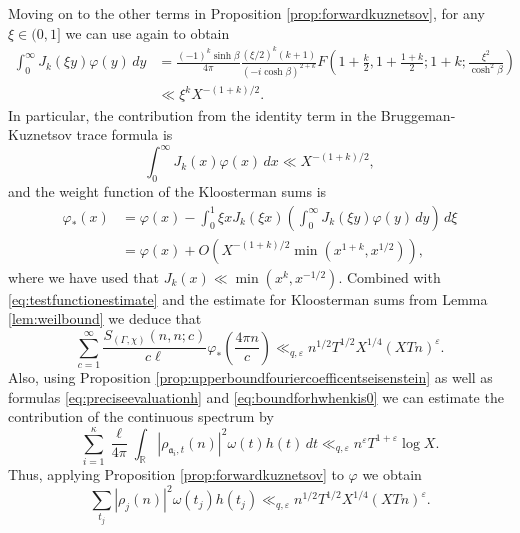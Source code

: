 \documentclass{article}
\theoremstyle{named}
\newcommand{\R}{\mathbb{R}}
\renewcommand{\a}{\mathfrak{a}}
\begin{document}
Moving on to the other terms in Proposition \ref{prop:forwardkuznetsov}, for any $\xi \in (0, 1]$ we can use \cite[\href{https://dlmf.nist.gov/10.22.E49}{(10.22.49)}]{dlmf} again to obtain
\begin{equation*}
\begin{aligned}
    \int_0^\infty J_k(\xi y)\varphi(y)\, dy  &=  \frac{(-1)^k \sinh \beta}{4\pi }\frac{(\xi/2)^k(k + 1)}{(-i\cosh \beta)^{2 + k}}F\left(1 + \frac{k}{2}, 1 +\frac{1 + k}{2}; 1 + k; \frac{\xi^2}{\cosh^2 \beta}\right)\\
    & \ll \xi^k X^{-(1 + k)/2}.
\end{aligned}
\end{equation*}
In particular, the contribution from the identity term in the Bruggeman-Kuznetsov trace formula is 
\begin{equation}\label{eq:identitytermestimate}
    \int_0^\infty J_k(x)\varphi(x) \, dx \ll X^{-(1 + k)/2},
\end{equation}
and the weight function of the Kloosterman sums is 
\begin{equation}\label{eq:weightkloostermansums}
\begin{aligned}
    \varphi_*(x) & = \varphi(x) - \int_0^1\xi x J_k(\xi x)\left(\int_0^\infty J_k(\xi y) \varphi(y)\, dy \right)\, d\xi\\
    & = \varphi(x) + O\left(X^{-(1 + k)/2} \min(x^{1 + k}, x^{1/2})\right),
\end{aligned}
\end{equation}
where we have used that $J_k(x) \ll \min(x^k, x^{-1/2})$. Combined with \eqref{eq:testfunctionestimate} and the estimate for Kloosterman sums from Lemma \ref{lem:weilbound} we deduce that 
\begin{equation*}
\sum_{c = 1}^\infty \frac{S_{(\Gamma, \chi)}(n, n; c)}{c \ell}\varphi_*\left(\frac{4\pi n}{c}\right) \ll_{q,\varepsilon} n^{1/2}T^{1/2}X^{1/4}(XTn)^\varepsilon.
\end{equation*}
Also, using Proposition \ref{prop:upperboundfouriercoefficentseisenstein} as well as formulas \eqref{eq:preciseevaluationh} and \eqref{eq:boundforhwhenkis0} we can estimate the contribution of the continuous spectrum by
\begin{equation*}
\sum_{i = 1}^\kappa\frac{\ell}{4\pi}\int_\R |\rho_{\a_i, t}(n)|^2 \omega(t)h(t)\, dt \ll_{q, \varepsilon} n^\varepsilon T^{1 + \varepsilon}\log X.
\end{equation*}
Thus, applying Proposition \ref{prop:forwardkuznetsov} to $\varphi$ we obtain 
\begin{equation}\label{eq:estimatecoefficientsproofofluosarnak}
    \sum_{t_j} |\rho_j(n)|^2 \omega(t_j)h(t_j)\ll_{q, \varepsilon} n^{1/2}T^{1/2}X^{1/4}(XTn)^\varepsilon.
\end{equation}
\end{document}
